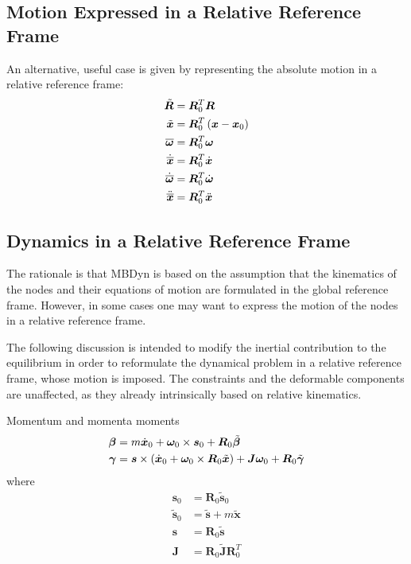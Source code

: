 \documentclass[10pt,fleqn,subeqn]{report}
\newcommand{\T}[1]{\bm{#1}}
\newcommand{\TT}[1]{\bm{#1}}
\begin{document}
\subsection{Motion Expressed in a Relative Reference Frame}
\label{sec:nodes:structural nodes:relative frame motion}
An alternative, useful case is given by representing the absolute motion
in a relative reference frame:
\begin{subequations}
\begin{align}
	\tilde{\TT{R}} &= \TT{R}_0^T \TT{R} \\
	\tilde{\T{x}} &= \TT{R}_0^T\plbr{\T{x} - \T{x}_0} \\
	\overline{\T{\omega}} &= \TT{R}_0^T \T{\omega} \\
	\dot{\overline{\T{x}}} &= \TT{R}_0^T \dot{\T{x}} \\
	\dot{\overline{\T{\omega}}} &= \TT{R}_0^T \dot{\T{\omega}} \\
	\ddot{\overline{\T{x}}} &= \TT{R}_0^T \ddot{\T{x}}
\end{align}
\end{subequations}


\subsection{Dynamics in a Relative Reference Frame}
\label{sec:nodes:structural nodes:relative frame dynamics}
The rationale is that MBDyn is based on the assumption
that the kinematics of the nodes and their equations of motion
are formulated in the global reference frame.
However, in some cases one may want to express the motion
of the nodes in a relative reference frame.

The following discussion is intended to modify the inertial contribution
to the equilibrium in order to reformulate the dynamical problem
in a relative reference frame, whose motion is imposed.
The constraints and the deformable components are unaffected,
as they already intrinsically based on relative kinematics.

Momentum and momenta moments
\begin{subequations}
\begin{align}
	\T{\beta}
	&= m \dot{\T{x}}_0
	+ \T{\omega}_0 \times \T{s}_0
	+ \TT{R}_0 \tilde{\T{\beta}} \\
	\T{\gamma}
	&= \T{s}\times\plbr{
		\dot{\T{x}}_0
		+ \T{\omega}_0 \times \TT{R}_0 \tilde{\T{x}}
	} + \TT{J} \T{\omega}_0
	+ \TT{R}_0 \tilde{\T{\gamma}}
\end{align}
\end{subequations}
where
\begin{align}
	\T{s}_0 &= \TT{R}_0 \tilde{\T{s}}_0 \\
	\tilde{\T{s}}_0 &= \tilde{\T{s}} + m \tilde{\T{x}} \\
	\T{s} &= \TT{R}_0 \tilde{\T{s}} \\
	\TT{J} &= \TT{R}_0 \tilde{\TT{J}} \TT{R}_0^T
\end{align}
\end{document}
